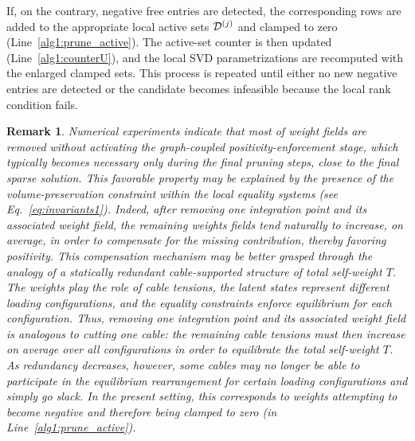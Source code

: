 \documentclass[11pt,a4paper]{article}
\newtheorem{remark}{Remark}
\begin{document}
If, on the contrary, negative free entries are detected, the
corresponding rows are added to the appropriate local active sets
\(\mathcal{D}^{(j)}\) and clamped to zero
(Line~\ref{alg1:prune_active}). The active-set counter is then updated
(Line~\ref{alg1:counterU}), and the local SVD parametrizations are
recomputed with the enlarged clamped sets. This process is repeated
until either no new negative entries are detected or the candidate
becomes infeasible because the local rank condition fails.






\begin{remark}
 Numerical experiments indicate that most  of weight fields
  are removed without activating the graph-coupled
positivity-enforcement stage, which typically becomes necessary only
during the final pruning steps, close to the final sparse solution. This favorable property may be explained by the presence of
the volume-preservation constraint within the local equality systems
(see Eq.~\ref{eq:invariants1}). Indeed, after removing one integration point and its associated weight
field, the remaining weights fields tend naturally to increase, on average,  in order to
compensate for the missing contribution, thereby favoring positivity. This compensation
mechanism may be better grasped through the analogy of a statically
redundant cable-supported structure of total self-weight \(T\). The  weights play the role of cable
tensions, the latent states represent different loading configurations,
and the equality constraints enforce equilibrium for each configuration.
Thus,
removing one integration point and its associated weight field is
analogous to cutting one cable: the remaining cable tensions must then
increase on average over all configurations  in order to equilibrate the total self-weight $T$. As redundancy
decreases, however, some cables may no longer be able to participate in
the equilibrium rearrangement for certain loading configurations and
simply go slack. In the present setting, this corresponds to weights
attempting to become negative and therefore being clamped to zero (in Line~\ref{alg1:prune_active}).
\end{remark}
\end{document}
